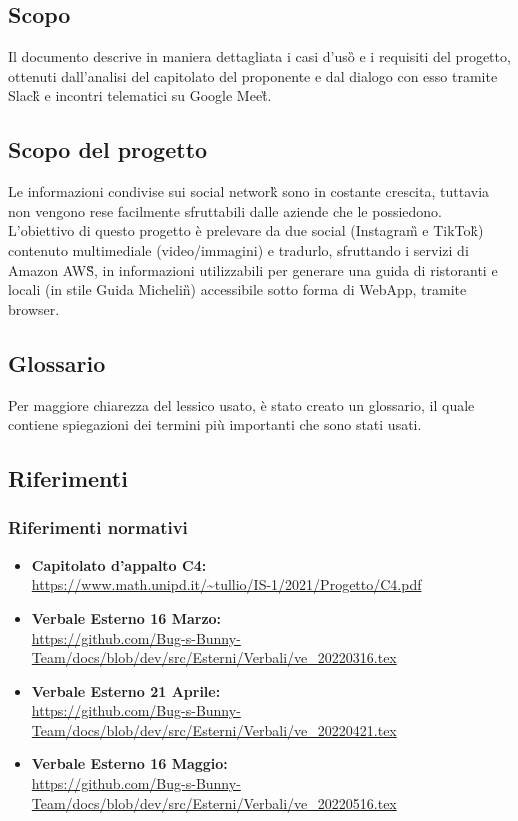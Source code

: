 \subsection{Scopo}
Il documento descrive in maniera dettagliata i casi d'uso\G{} e i requisiti del progetto, ottenuti dall'analisi del capitolato del proponente \proponente{} e dal dialogo con esso tramite Slack\G{} e incontri telematici su Google Meet\G{}.

\subsection{Scopo del progetto}
Le informazioni condivise sui social network\G{} sono in costante crescita, tuttavia non vengono rese facilmente sfruttabili dalle aziende che le possiedono. L'obiettivo di questo progetto è prelevare da due social (Instagram\G{} e TikTok\G{}) contenuto multimediale (video/immagini) e tradurlo, sfruttando i servizi di Amazon AWS\G{}, in informazioni utilizzabili per generare una guida di ristoranti e locali (in stile Guida Michelin\G{}) accessibile sotto forma di WebApp, tramite browser.

\subsection{Glossario}
Per maggiore chiarezza del lessico usato, è stato creato un glossario, il quale 
contiene spiegazioni dei termini più importanti che sono stati usati.

\subsection{Riferimenti}
\subsubsection{Riferimenti normativi}
\begin{itemize}
	\item
	{\textbf{Capitolato d'appalto C4:}}\\\url{https://www.math.unipd.it/~tullio/IS-1/2021/Progetto/C4.pdf}
    \item
    {\textbf{Verbale Esterno 16 Marzo:}}\\\url{https://github.com/Bug-s-Bunny-Team/docs/blob/dev/src/Esterni/Verbali/ve_20220316.tex}
    \item
	{\textbf{Verbale Esterno 21 Aprile:}}\\\url{https://github.com/Bug-s-Bunny-Team/docs/blob/dev/src/Esterni/Verbali/ve_20220421.tex}
    \item
	{\textbf{Verbale Esterno 16 Maggio:}}\\\url{https://github.com/Bug-s-Bunny-Team/docs/blob/dev/src/Esterni/Verbali/ve_20220516.tex}

\end{itemize}
